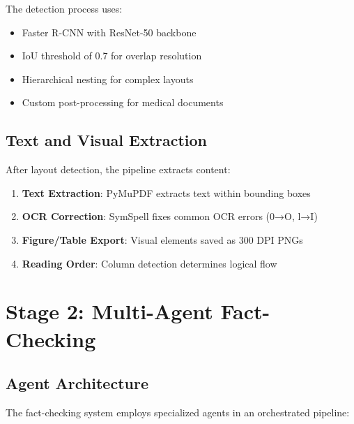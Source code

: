 \documentclass[11pt]{article}
\begin{document}
The detection process uses:
\begin{itemize}[leftmargin=*,topsep=0pt,itemsep=0pt]
\item Faster R-CNN with ResNet-50 backbone
\item IoU threshold of 0.7 for overlap resolution
\item Hierarchical nesting for complex layouts
\item Custom post-processing for medical documents
\end{itemize}

\subsection{Text and Visual Extraction}

After layout detection, the pipeline extracts content:

\begin{enumerate}[leftmargin=*,topsep=0pt,itemsep=0pt]
\item \textbf{Text Extraction}: PyMuPDF extracts text within bounding boxes
\item \textbf{OCR Correction}: SymSpell fixes common OCR errors (0→O, l→I)
\item \textbf{Figure/Table Export}: Visual elements saved as 300 DPI PNGs
\item \textbf{Reading Order}: Column detection determines logical flow
\end{enumerate}

\section{Stage 2: Multi-Agent Fact-Checking}

\subsection{Agent Architecture}

The fact-checking system employs specialized agents in an orchestrated pipeline:
\end{document}
